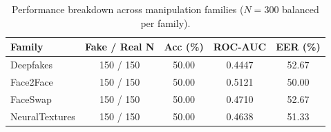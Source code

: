 \begin{table}[ht]
\centering\small
\begin{tabular}{lcccc}
\toprule
Family & Fake / Real N & Acc (\%) & ROC-AUC & EER (\%) \\
\midrule
Deepfakes & 150 / 150 & 50.00 & 0.4447 & 52.67 \\
Face2Face & 150 / 150 & 50.00 & 0.5121 & 50.00 \\
FaceSwap & 150 / 150 & 50.00 & 0.4710 & 52.67 \\
NeuralTextures & 150 / 150 & 50.00 & 0.4638 & 51.33 \\
\bottomrule
\end{tabular}
\caption{Performance breakdown across manipulation families ($N=300$ balanced per family).}
\label{tab:manipulation_results}
\end{table}
